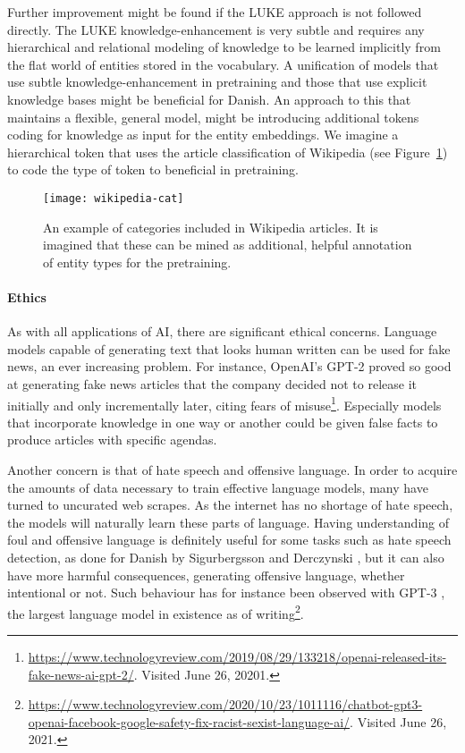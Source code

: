 \documentclass[main.tex]{subfiles}
\begin{document}
Further improvement might be found if the LUKE approach is not followed directly.
The LUKE knowledge-enhancement is very subtle and requires any hierarchical and relational modeling of knowledge to be learned implicitly from the flat world of entities stored in the vocabulary.
A unification of models that use subtle knowledge-enhancement in pretraining and those that use explicit knowledge bases might be beneficial for Danish.
An approach to this that maintains a flexible, general model, might be introducing additional tokens coding for knowledge as input for the entity embeddings.
We imagine a hierarchical token that uses the article classification of Wikipedia (see Figure~\ref{fig:wikipedia-cat}) to code the type of token to beneficial in pretraining.
\begin{figure}[H]
    \centering
    \texttt{[image: wikipedia-cat]}
    \caption{An example of categories included in Wikipedia articles. It is imagined that these can be mined as additional, helpful annotation of entity types for the pretraining.}
    \label{fig:wikipedia-cat}
\end{figure}\noindent

\paragraph{Ethics}
As with all applications of AI, there are significant ethical concerns.
Language models capable of generating text that looks human written can be used for fake news, an ever increasing problem.
For instance, OpenAI's GPT-2 \cite{Radford2019gpt2} proved so good at generating fake news articles that the company decided not to release it initially and only incrementally later, citing fears of misuse\footnote{\url{https://www.technologyreview.com/2019/08/29/133218/openai-released-its-fake-news-ai-gpt-2/}. Visited June 26, 20201.}.
Especially models that incorporate knowledge in one way or another could be given false facts to produce articles with specific agendas.

Another concern is that of hate speech and offensive language.
In order to acquire the amounts of data necessary to train effective language models, many have turned to uncurated web scrapes.
As the internet has no shortage of hate speech, the models will naturally learn these parts of language.
Having understanding of foul and offensive language is definitely useful for some tasks such as hate speech detection, as done for Danish by Sigurbergsson and Derczynski \cite{sigurbergsson-derczynski-2020-offensive}, but it can also have more harmful consequences, generating offensive language, whether intentional or not.
Such behaviour has for instance been observed with GPT-3 \cite{brown2020language}, the largest language model in existence as of writing\footnote{\url{https://www.technologyreview.com/2020/10/23/1011116/chatbot-gpt3-openai-facebook-google-safety-fix-racist-sexist-language-ai/}. Visited June 26, 2021.}.
\end{document}
